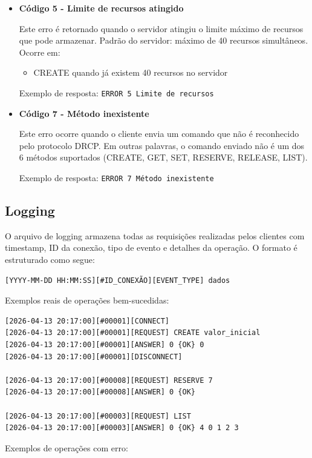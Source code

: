 \documentclass{article}
\begin{document}
\begin{itemize}
	\item \textbf{Código 5 - Limite de recursos atingido}
	
	Este erro é retornado quando o servidor atingiu o limite máximo de recursos que pode armazenar. Padrão do servidor: máximo de 40 recursos simultâneos. Ocorre em:
	\begin{itemize}
		\item CREATE quando já existem 40 recursos no servidor
	\end{itemize}
	
	Exemplo de resposta: \texttt{{ERROR} 5 Limite de recursos}
	
	\item \textbf{Código 7 - Método inexistente}
	
	Este erro ocorre quando o cliente envia um comando que não é reconhecido pelo protocolo DRCP. Em outras palavras, o comando enviado não é um dos 6 métodos suportados (CREATE, GET, SET, RESERVE, RELEASE, LIST).
	
	Exemplo de resposta: \texttt{{ERROR} 7 Método inexistente}
\end{itemize}

\subsection{Logging}

O arquivo de logging armazena todas as requisições realizadas pelos clientes com timestamp, ID da conexão, tipo de evento e detalhes da operação.
O formato é estruturado como segue:

\begin{Verbatim}[tabsize=4]
	[YYYY-MM-DD HH:MM:SS][#ID_CONEXÃO][EVENT_TYPE] dados
\end{Verbatim}

Exemplos reais de operações bem-sucedidas:

\begin{Verbatim}[tabsize=4]
[2026-04-13 20:17:00][#00001][CONNECT]
[2026-04-13 20:17:00][#00001][REQUEST] CREATE valor_inicial
[2026-04-13 20:17:00][#00001][ANSWER] 0 {OK} 0
[2026-04-13 20:17:00][#00001][DISCONNECT]

[2026-04-13 20:17:00][#00008][REQUEST] RESERVE 7
[2026-04-13 20:17:00][#00008][ANSWER] 0 {OK}

[2026-04-13 20:17:00][#00003][REQUEST] LIST
[2026-04-13 20:17:00][#00003][ANSWER] 0 {OK} 4 0 1 2 3
\end{Verbatim}

Exemplos de operações com erro:
\end{document}
